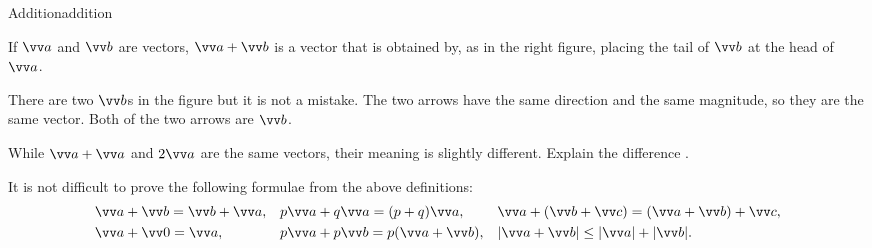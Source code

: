 \documentclass[11pt,pdfa,lastpage]{MishoNote}
\begin{document}
\begin{definition}{Addition}{addition}
\begin{minipage}[b]{0.5\textwidth}
If $\vc a$ and $\vc b$ are vectors, $\vc a+\vc b$ is a vector that is obtained by, as in the right figure, placing the tail of $\vc b$ at the head of $\vc a$.
\vspace{3em}
\end{minipage}\hfill
\begin{minipage}[b]{0.4\textwidth}
\end{minipage}
\end{definition}
There are two $\vc b$s in the figure but it is not a mistake. The two arrows have the same direction and the same magnitude, so they are the same vector. Both of the two arrows are $\vc b$.

\pagebreak[3]

\begin{quizzes}
  \Quiz[A] While $\vc a+\vc a$ and $2\vc a$ are the same vectors, their meaning is slightly different. Explain the difference .
\end{quizzes}

It is not difficult to prove the following formulae from the above definitions:
\begin{align}
  &\vc a+\vc b=\vc b+\vc a,&
  &p\vc a+q\vc a=(p+q)\vc a,&
  &\vc a+(\vc b+\vc c)=(\vc a+\vc b)+\vc c,\notag\\
  &\vc a+\vc 0=\vc a,&
  &p\vc a+p\vc b=p(\vc a+\vc b),&
  &|\vc a+\vc b|\le|\vc a|+|\vc b|.\label{eq:addformula}
\end{align}



\end{document}
